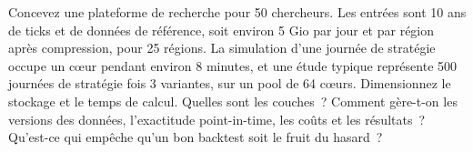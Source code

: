\begin{question}\label{iq:iv3:system-design:40}
Concevez une plateforme de recherche pour 50 chercheurs. Les entrées sont 10 ans de ticks et de données de référence, soit environ 5 Gio par jour et par région après compression, pour 25 régions. La simulation d'une journée de stratégie occupe un cœur pendant environ 8 minutes, et une étude typique représente 500 journées de stratégie fois 3 variantes, sur un pool de 64 cœurs. Dimensionnez le stockage et le temps de calcul. Quelles sont les couches~? Comment gère-t-on les versions des données, l'exactitude point-in-time, les coûts et les résultats~? Qu'est-ce qui empêche qu'un bon backtest soit le fruit du hasard~?
\end{question}
